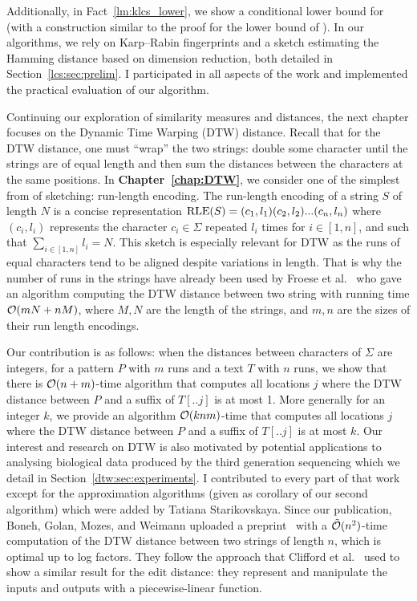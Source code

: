 Additionally, in Fact~\ref{lm:klcs_lower}, we show a conditional lower bound for \kApproxLCS (with a construction similar to the proof for the lower bound of \kLCS ).
In our algorithms, we rely on Karp--Rabin fingerprints and a sketch estimating the Hamming distance based on dimension reduction, both detailed in Section~\ref{lcs:sec:prelim}.
I participated in all aspects of the work and implemented the practical evaluation of our algorithm.

Continuing our exploration of similarity measures and distances, the next chapter focuses on the Dynamic Time Warping (DTW) distance. Recall that for the DTW distance, one must ``wrap'' the two strings: double some character until the strings are of equal length and then sum the distances between the characters at the same positions.
In \textbf{Chapter~\ref{chap:DTW}}, we consider one of the simplest from of sketching: run-length encoding. The run-length encoding of a string $S$ of length $N$ is a concise representation $\mathrm{RLE}(S)=(c_1,l_1)(c_2,l_2)...(c_n,l_n)$ where $(c_i,l_i)$ represents the character $c_i \in \Sigma$ repeated $l_i$ times  for $i \in [1,n]$, and such that $\sum_{i\in [1,n]} l_i = N$.
This sketch is especially relevant for DTW as the runs of equal characters tend to be aligned despite variations in length. That is why the number of runs in the strings have already been used by Froese et al.~\cite{DBLP:journals/corr/abs-1903-03003} who gave an algorithm computing the DTW distance between two string with running time $\mathcal{O}(mN+nM)$, where $M,N$ are the length of the strings, and $m, n$ are the sizes of their run length encodings.

Our contribution is as follows: when the distances between characters of $\Sigma$ are integers, for a pattern $P$ with $m$ runs and a text $T$ with $n$ runs, we show that there is $\mathcal{O}(n+m)$-time algorithm that computes all locations $j$ where the DTW distance between $P$ and a suffix of $T[..j]$ is at most 1. More generally for an integer $k$, we provide an algorithm $\mathcal{O}(knm)$-time that computes all locations $j$ where the DTW distance between $P$ and a suffix of $T[..j]$ is at most $k$.
Our interest and research on DTW is also motivated by potential applications to analysing biological data produced by the third generation sequencing which we detail in Section~\ref{dtw:sec:experiments}.
I contributed to every part of that work except for the approximation algorithms (given as corollary of our second algorithm) which were added by Tatiana Starikovskaya.
Since our publication, Boneh, Golan, Mozes, and Weimann uploaded a preprint~\cite{boneh2023near} with a $\tilde{\mathcal{O}}(n^2)$-time computation of the DTW distance between two strings of length $n$, which is optimal up to log factors. They follow the approach that Clifford et al.~\cite{clifford2019rle} used to show a similar result for the edit distance: they represent and manipulate the inputs and outputs with a piecewise-linear function.

